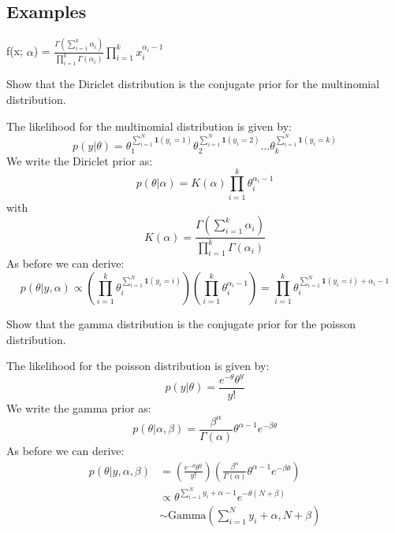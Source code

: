 \documentclass[DIV=14,titlepage=false]{scrreprt}
\begin{document}
\subsection{Examples}
\begin{definition}
f(x; $\alpha$) = $\frac{\Gamma(\sum_{i=1}^k \alpha_i)}{\prod_{i=1}^k \Gamma(\alpha_i)}\prod_{i=1}^k x_i^{\alpha_i-1}$
\end{definition}
\begin{question}
    Show that the Diriclet distribution is the conjugate prior for the multinomial distribution.
\end{question}
\begin{solution}
    The likelihood for the multinomial distribution is given by:
    \[
        p(y|\theta) =\theta_1 ^{\sum_{i=1}^N \mathbf{1}(y_i=1)}\theta_2^{\sum_{i=1}^N \mathbf{1}(y_i=2)}\ldots\theta_k^{\sum_{i=1}^N \mathbf{1}(y_i=k)}
    \]
    We write the Diriclet prior as:
    \[
        p(\theta|\alpha) = K(\alpha)\prod_{i=1}^k \theta_i^{\alpha_i-1}
    \]
    with\[
        K(\alpha) = \frac{\Gamma(\sum_{i=1}^k \alpha_i)}{\prod_{i=1}^k \Gamma(\alpha_i)}
    \]
    As before we can derive:
    \[
        p(\theta|y,\alpha) \propto \left(\prod_{i=1}^k \theta_i^{\sum_{i=1}^N \mathbf{1}(y_i=i)}\right)\left(\prod_{i=1}^k \theta_i^{\alpha_i-1}\right) = \prod_{i=1}^k \theta_i^{\sum_{i=1}^N \mathbf{1}(y_i=i) + \alpha_i-1}
    \]
\end{solution}
\begin{question}
    Show that the gamma distribution is the conjugate prior for the poisson distribution.
\end{question}
\begin{solution}
    The likelihood for the poisson distribution is given by:
    \[
        p(y|\theta) = \frac{e^{-\theta}\theta^y}{y!}
    \]
    We write the gamma prior as:
    \[
        p(\theta|\alpha,\beta) = \frac{\beta^\alpha}{\Gamma(\alpha)}\theta^{\alpha-1}e^{-\beta\theta}
    \]
    As before we can derive:
    \begin{align*}
        p(\theta|y,\alpha,\beta) &= \left( \frac{e^{-\theta}\theta^y}{y!}\right)\left(\frac{\beta^\alpha}{\Gamma(\alpha)}\theta^{\alpha-1}e^{-\beta\theta}\right)\\
         & \propto \theta^{\sum_{i=1}^N y_i + \alpha - 1}e^{-\theta(N+\beta)}\\
            & \sim \text{Gamma}(\sum_{i=1}^N y_i + \alpha, N+\beta)
    \end{align*}
\end{solution}
\end{document}
